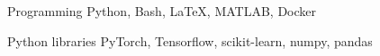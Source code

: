 

\begin{cvskills}

  \cvskill
    {Programming} %
    {Python, Bash, LaTeX, MATLAB, Docker} %

  \cvskill
    {Python libraries} %
    {PyTorch, Tensorflow, scikit-learn, numpy, pandas} %

\end{cvskills}

\clearpage
